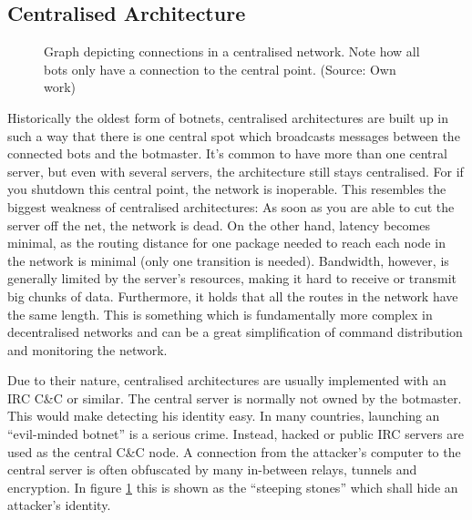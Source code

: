 \documentclass{llncs}
\begin{document}
\subsection{Centralised Architecture}
%
%
\begin{figure}[htbp]
  \centering
  \caption{Graph depicting connections in a centralised network. Note
    how all bots only have a connection to the central point. (Source: Own work)}
  \label{central-network}
\end{figure}
Historically the oldest form of botnets, centralised architectures are
built up in such a way that there is one central spot which broadcasts
messages between the connected bots and the botmaster.  It's common to
have more than one central server\cite{td1sc}, but even with several
servers, the architecture still stays centralised. For if you shutdown
this central point, the network is inoperable. This resembles the
biggest weakness of centralised architectures: As soon as you are able
to cut the server off the net, the network is dead. On the other hand,
latency becomes minimal, as the routing distance for one package
needed to reach each node in the network is minimal (only one
transition is needed). Bandwidth, however, is generally limited by the
server's resources, making it hard to receive or transmit big chunks
of data. Furthermore, it holds that all the routes in the network have
the same length. This is something which is fundamentally more complex
in decentralised networks and can be a great simplification of command
distribution and monitoring the network.

Due to their nature, centralised architectures are usually implemented
with an IRC C\&C or similar\cite{cooke2005zombie}. The central server
is normally not owned by the botmaster. This would make detecting his
identity easy. In many countries, launching an ``evil-minded botnet''
is a serious crime. Instead, hacked or public IRC servers are used as
the central C\&C node. A connection from the attacker's computer to
the central server is often obfuscated by many in-between relays,
tunnels and encryption. In figure
\ref{central-network} this is shown as the ``steeping stones'' which
shall hide an attacker's identity.
\end{document}
